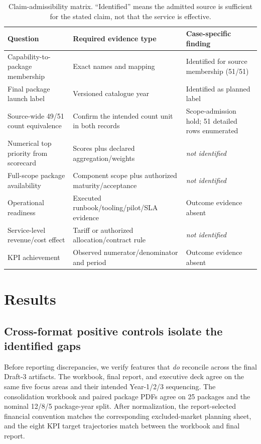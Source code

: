 \documentclass[systems,article,submit,moreauthors]{Definitions/mdpi}
\newcommand{\NI}{\textit{not identified}}
\begin{document}
\begin{table}[H]
\centering
\small
\caption{Claim-admissibility matrix. ``Identified'' means the admitted source is sufficient for the stated claim, not that the service is effective.}
\begin{tabularx}{\linewidth}{>{\raggedright\arraybackslash}p{3.1cm} X >{\raggedright\arraybackslash}p{2.9cm}}
\toprule
Question & Required evidence type & Case-specific finding \\
\midrule
Capability-to-package membership & Exact names and mapping & Identified for source membership (51/51) \\
Final package launch label & Versioned catalogue year & Identified as planned label \\
Source-wide 49/51 count equivalence & Confirm the intended count unit in both records & Scope-admission hold; 51 detailed rows enumerated \\
Numerical top priority from scorecard & Scores plus declared aggregation/weights & \NI{} \\
Full-scope package availability & Component scope plus authorized maturity/acceptance & \NI{} \\
Operational readiness & Executed runbook/tooling/pilot/SLA evidence & Outcome evidence absent \\
Service-level revenue/cost effect & Tariff or authorized allocation/contract rule & \NI{} \\
KPI achievement & Observed numerator/denominator and period & Outcome evidence absent \\
\bottomrule
\end{tabularx}
\end{table}

\section{Results}

\subsection{Cross-format positive controls isolate the identified gaps}
Before reporting discrepancies, we verify features that \emph{do} reconcile across the final Draft-3 artifacts. The workbook, final report, and executive deck agree on the same five focus areas and their intended Year-1/2/3 sequencing. The consolidation workbook and paired package PDFs agree on 25 packages and the nominal 12/8/5 package-year split. After normalization, the report-selected financial convention matches the corresponding excluded-market planning sheet, and the eight KPI target trajectories match between the workbook and final report.
\end{document}

